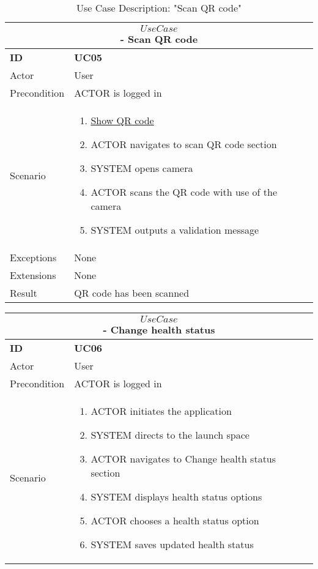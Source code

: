 \begin{center}
    \vspace{5mm}
    \begin{table}[H]
        \begin{tabular}{ |p{2cm}||p{11cm}| }
            \hline
            \multicolumn{2}{|c|}{$$Use Case$$ - Scan QR code} \\ \hline
            \textbf{ID} & \textbf{UC05} \\ \hline
            Actor & User \\ \hline
            Precondition & ACTOR is logged in \\ \hline
            Scenario &
            \begin{enumerate}
                \item \underline{Show QR code}
                \item ACTOR navigates to scan QR code section
                \item SYSTEM opens camera
                \item ACTOR scans the QR code with use of the camera
                \item SYSTEM outputs a validation message
            \end{enumerate}
            \\ \hline 
            Exceptions & None \\ \hline
            Extensions & None \\ \hline
            Result & QR code has been scanned \\ \hline
        \end{tabular}
        \caption{Use Case Description: "Scan QR code"}
    \end{table}
    
    \vspace{5mm}
    \begin{table}[H]
        \begin{tabular}{ |p{2cm}||p{11cm}| }
            \hline
            \multicolumn{2}{|c|}{$$Use Case$$ - Change health status} \\ \hline
            \textbf{ID} & \textbf{UC06} \\ \hline
            Actor & User \\ \hline
            Precondition & ACTOR is logged in \\ \hline
            Scenario &
            \begin{enumerate}
                \item ACTOR initiates the application
                \item SYSTEM directs to the launch space
                \item ACTOR navigates to Change health status section
                \item SYSTEM displays health status options
                \item ACTOR chooses a health status option
                \item SYSTEM saves updated health status
                

\end{enumerate}
\end{tabular}
\end{table}
\end{center}
